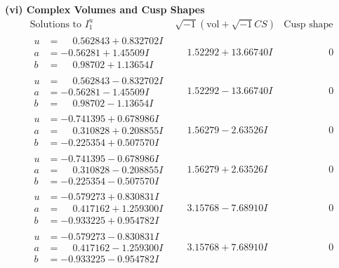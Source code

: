 \documentclass[1p]{elsarticle_modified}
\theoremstyle{definition}
\newcommand{\I}{\sqrt{-1}}
\begin{document}
\newpage\flushleft \textbf{(vi) Complex Volumes and Cusp Shapes}
$$\begin{array}{c|c|c}  
\text{Solutions to }I^u_{1}& \I (\text{vol} + \sqrt{-1}CS) & \text{Cusp shape}\\
 \hline 
\begin{aligned}
u &= \phantom{-}0.562843 + 0.832702 I \\
a &= -0.56281 + 1.45509 I \\
b &= \phantom{-}0.98702 + 1.13654 I\end{aligned}
 & \phantom{-}1.52292 + 13.66740 I & \phantom{-0.000000 } 0 \\ \hline\begin{aligned}
u &= \phantom{-}0.562843 - 0.832702 I \\
a &= -0.56281 - 1.45509 I \\
b &= \phantom{-}0.98702 - 1.13654 I\end{aligned}
 & \phantom{-}1.52292 - 13.66740 I & \phantom{-0.000000 } 0 \\ \hline\begin{aligned}
u &= -0.741395 + 0.678986 I \\
a &= \phantom{-}0.310828 + 0.208855 I \\
b &= -0.225354 + 0.507570 I\end{aligned}
 & \phantom{-}1.56279 - 2.63526 I & \phantom{-0.000000 } 0 \\ \hline\begin{aligned}
u &= -0.741395 - 0.678986 I \\
a &= \phantom{-}0.310828 - 0.208855 I \\
b &= -0.225354 - 0.507570 I\end{aligned}
 & \phantom{-}1.56279 + 2.63526 I & \phantom{-0.000000 } 0 \\ \hline\begin{aligned}
u &= -0.579273 + 0.830831 I \\
a &= \phantom{-}0.417162 + 1.259300 I \\
b &= -0.933225 + 0.954782 I\end{aligned}
 & \phantom{-}3.15768 - 7.68910 I & \phantom{-0.000000 } 0 \\ \hline\begin{aligned}
u &= -0.579273 - 0.830831 I \\
a &= \phantom{-}0.417162 - 1.259300 I \\
b &= -0.933225 - 0.954782 I\end{aligned}
 & \phantom{-}3.15768 + 7.68910 I & \phantom{-0.000000 } 0 \\ \hline\begin{aligned}

\end{aligned}
\end{array}$$
\end{document}
